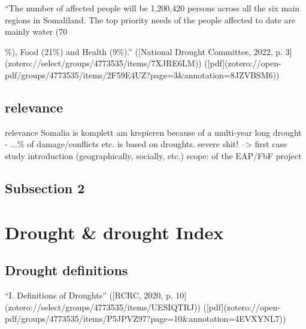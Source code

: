“The number of affected people will be 1,200,420 persons across all the six main regions in Somaliland. The top priority needs of the people affected to date are mainly water (70{\%), Food (21\%) and Health (9\%).” ([National Drought Committee, 2022, p. 3](zotero://select/groups/4773535/items/7XJRE6LM)) ([pdf](zotero://open-pdf/groups/4773535/items/2F59E4UZ?page=3&annotation=8JZVBSM6))

\subsection{relevance}
relevance
Somalia is komplett am krepieren because of a multi-year long drought - ...\% of damage/conflicts etc. is based on droughts. severe shit! --> first case study introduction (geographically, socially, etc.) 
scope: of the EAP/FbF project

\subsection{Subsection 2}



\section{Drought & drought Index}

\subsection{Drought definitions}

“I. Definitions of Droughts” ([RCRC, 2020, p. 10](zotero://select/groups/4773535/items/UESIQTRJ)) ([pdf](zotero://open-pdf/groups/4773535/items/P5JPVZ97?page=10&annotation=4EVXYNL7))

}
